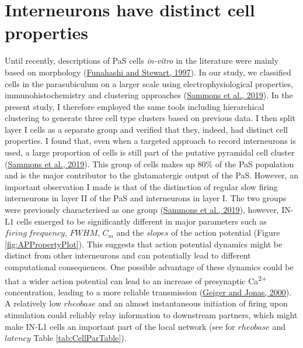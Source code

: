 \documentclass[
  12pt,
  a4paper,
  openany]{book}
\begin{document}
\hypertarget{interneurons-have-distinct-cell-properties}{%
\section{Interneurons have distinct cell properties}\label{interneurons-have-distinct-cell-properties}}

Until recently, descriptions of PaS cells \emph{in-vitro} in the literature were mainly based on morphology (\protect\hyperlink{ref-funahashi_presubicular_1997}{Funahashi and Stewart, 1997}). In our study, we classified cells in the parasubiculum on a larger scale using electrophysiological properties, immunohistochemistry and clustering approaches (\protect\hyperlink{ref-sammons_electrophysiological_2019}{Sammons et al., 2019}). In the present study, I therefore employed the same tools including hierarchical clustering to generate three cell type clusters based on previous data. I then split layer I cells as a separate group and verified that they, indeed, had distinct cell properties. I found that, even when a targeted approach to record interneurons is used, a large proportion of cells is still part of the putative pyramidal cell cluster (\protect\hyperlink{ref-sammons_electrophysiological_2019}{Sammons et al., 2019}). This group of cells makes up \(80\%\) of the PaS population and is the major contributor to the glutamatergic output of the PaS. However, an important observation I made is that of the distinction of regular slow firing interneurons in layer II of the PaS and interneurons in layer I. The two groups were previously characterised as one group (\protect\hyperlink{ref-sammons_electrophysiological_2019}{Sammons et al., 2019}), however, IN-L1 cells emerged to be significantly different in major parameters such as \(firing\ frequency\), \(FWHM\), \(C_{m}\) and the \(slopes\) of the action potential (Figure \ref{fig:APPropertyPlot}). This suggests that action potential dynamics might be distinct from other interneurons and can potentially lead to different computational consequences. One possible advantage of these dynamics could be that a wider action potential can lead to an increase of presynaptic Ca\textsuperscript{2+} concentration, leading to a more reliable transmission (\protect\hyperlink{ref-geiger_dynamic_2000}{Geiger and Jonas, 2000}). A relatively low \(rheobase\) and an almost instantaneous initiation of firing upon stimulation could reliably relay information to downstream partners, which might make IN-L1 cells an important part of the local network (see for \(rheobase\) and \(latency\) Table \ref{tab:CellParTable}).
\end{document}
